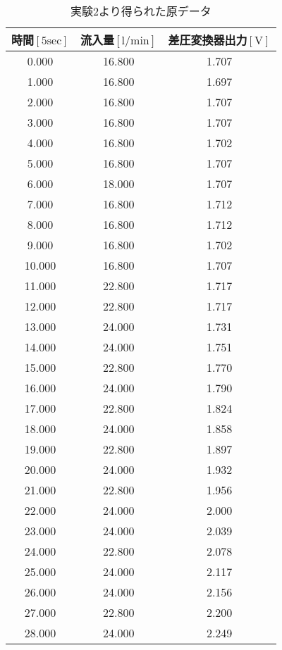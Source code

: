 \documentclass[11pt,a4paper]{jsarticle}
\begin{document}
\setcounter{equation}{0}
\setcounter{figure}{0}
\setcounter{table}{0}

\begin{center}
  \begin{longtable}{|c|c|c|}
    \caption{実験2より得られた原データ} \\ \hline
    時間$\mathrm{[5sec]}$ & 流入量$\mathrm{[l/min]}$ & 差圧変換器出力$\mathrm{[V]}$ \\
    \hline \hline \endhead
0.000 & 16.800& 1.707 \\ \hline
1.000 & 16.800&  1.697 \\ \hline
2.000 & 16.800&  1.707 \\ \hline
3.000 & 16.800&  1.707 \\ \hline
4.000 & 16.800&  1.702 \\ \hline
5.000 & 16.800&  1.707 \\ \hline
6.000 & 18.000&  1.707 \\ \hline
7.000 & 16.800&  1.712 \\ \hline
8.000 & 16.800&  1.712 \\ \hline
9.000 & 16.800&  1.702 \\ \hline
10.000	 & 16.800&  1.707 \\ \hline
11.000	 & 22.800&  1.717 \\ \hline
12.000	 & 22.800&  1.717 \\ \hline
13.000	 & 24.000&  1.731 \\ \hline
14.000	 & 24.000&  1.751 \\ \hline
15.000	 & 22.800&  1.770 \\ \hline
16.000	 & 24.000&  1.790 \\ \hline
17.000	 & 22.800&  1.824 \\ \hline
18.000	 & 24.000&  1.858 \\ \hline
19.000	 & 22.800&  1.897 \\ \hline
20.000	 & 24.000&  1.932 \\ \hline
21.000	 & 22.800&  1.956 \\ \hline
22.000	 & 24.000&  2.000 \\ \hline
23.000	 & 24.000&  2.039 \\ \hline
24.000	 & 22.800&  2.078 \\ \hline
25.000	 & 24.000&  2.117 \\ \hline
26.000	 & 24.000&  2.156 \\ \hline
27.000	 & 22.800&  2.200 \\ \hline
28.000	 & 24.000&  2.249 \\ \hline

\end{longtable}
\end{center}
\end{document}
